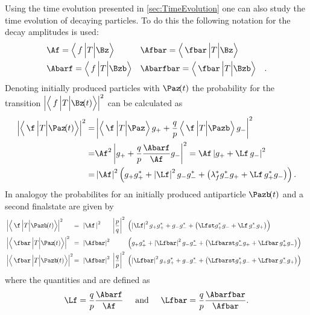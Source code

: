 Using the time evolution presented in \cref{sec:TimeEvolution} one can also study the time evolution of decaying particles.
To do this the following notation for the decay amplitudes is used:
\begin{equation}
\begin{aligned}
&\Af = \left<\,f\,\Big|T\Big|\Bz\right>&&\Afbar = \left<\,\fbar\,\Big|T\Big|\Bz\right>&\\
&\Abarf = \left<\,f\,\Big|T\Big|\Bzb\right>&&\Abarfbar = \left<\,\fbar\,\Big|T\Big|\Bzb\right>&.
\end{aligned}
\end{equation}
Denoting initially produced particles with $\Paz\!(t)$ the probability for the transition $\left|\left<\,f\,\Big|T\Big|\Bz\!(t)\right>\right|^2$ can be calculated as
\begin{align}
\left|\left<\,\f\,\Big|T\Big|\Paz\!(t)\right>\right|^2 =&
\left|\left<\,\f\,\Big|T\Big|\Paz\right>g_++\frac{q}{p}\left<\,\f\,\Big|T\Big|\Pazb\right>g_-\right|^2\nonumber\\
=&\Af^2\left|g_+ + \frac{q}{p}\frac{\Abarf}{\Af} g_-\right|^2=\Af\left|g_+ +\Lf\,g_-\right|^2\nonumber\\
=&\left|\Af\right|^2\left(g_+g_+^*+\left|\Lf\right|^2g_-g_-^*+\left(\lambda_{f}^*g_-^*g_+ + \Lf\,g_+^* g_-\right)\right).
\end{align}
In analogoy the probabilites for an initially produced antiparticle $\Pazb\!(t)$ and a second finalstate \fbar are given by
\begin{align}
&\left|\left<\,\f\,\Big|T\Big|\Pazb\!(t)\right>\right|^2&\kern -8.5pt{=}
&\kern 6.0pt{\left|\Af\,\right|^2}&&\kern -5.5pt{\left|\frac{p}{q}\right|^2}& &\kern -5.5pt{\left(\left|\Lf\right|^2g_+g_+^*+g_-g_-^*+\left(\Lfst g_+^*g_- + \Lf\,g_-^* g_+\right)\right)}&\\
&\left|\left<\,\fbar\,\Big|T\Big|\Paz\!(t)\right>\right|^2&\kern -8.5pt{=}
&\kern 6.0pt{\left|\Afbar\right|^2}& && &\kern -5.5pt{\left(g_+g_+^*+\left|\Lfbar\right|^2g_-g_-^*+\left(\Lfbarst g_-^*g_+ + \Lfbar\,g_+^* g_-\right)\right)}&\\
&\left|\left<\,\fbar\,\Big|T\Big|\Pazb\!(t)\right>\right|^2&\kern -8.5pt{=}
&\kern 6.0pt{\left|\Afbar\right|^2}& &\kern -5.5pt{\left|\frac{q}{p}\right|^2}& &\kern -5.5pt{\left(\left|\Lfbar\right|^2g_+g_+^*+g_-g_-^*+\left(\Lfbarst g_+^*g_- + \Lfbar\,g_-^* g_+\right)\right)}&
\end{align}
where the quantities \Lf and \Lfbar are defined as
\begin{equation}
\Lf=\frac{q}{p}\frac{\Abarf}{\Af}\hspace{0.5cm}\text{and}
\hspace{0.5cm}\Lfbar=\frac{q}{p}\frac{\Abarfbar}{\Afbar}.\label{eq:defLambdas}
\end{equation}
